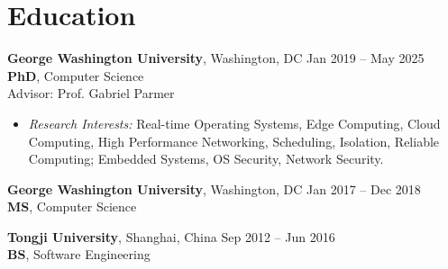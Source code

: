 \section{Education}
\textbf{George Washington University}, Washington, DC \hfill
{\small Jan 2019 -- May 2025}
\\
\textbf{PhD}, Computer Science \hfill
\\
{Advisor:} Prof. Gabriel Parmer
\\
\begin{itemize}[leftmargin=*]
  \setlength\itemsep{-0.0em}
\vspace{-0.8em}
\item {\sl Research Interests:} {Real-time Operating Systems, Edge Computing, Cloud Computing, High Performance Networking, Scheduling, Isolation, Reliable Computing; Embedded Systems, OS Security, Network Security.}
\end{itemize}
\vspace{-0.3em}

\textbf{George Washington University}, Washington, DC \hfill
{\small Jan 2017 -- Dec 2018}
\\
\textbf{MS}, Computer Science

\textbf{Tongji University}, Shanghai, China \hfill
{\small Sep 2012 -- Jun 2016}
\\
\textbf{BS}, Software Engineering
\\
